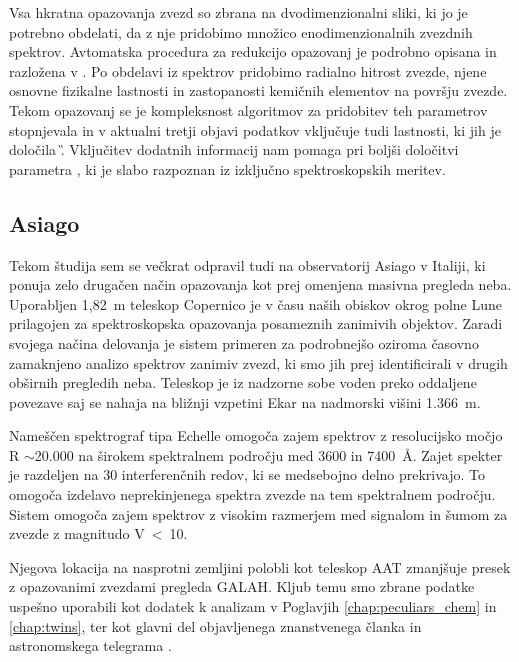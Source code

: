 Vsa hkratna opazovanja zvezd so zbrana na dvodimenzionalni sliki, ki jo je potrebno obdelati, da z nje pridobimo množico enodimenzionalnih zvezdnih spektrov. Avtomatska procedura za redukcijo opazovanj je podrobno opisana in razložena v \citet{2017MNRAS.464.1259K}. Po obdelavi iz spektrov pridobimo radialno hitrost zvezde, njene osnovne fizikalne lastnosti in zastopanosti kemičnih elementov na površju zvezde. Tekom opazovanj se je kompleksnost algoritmov za pridobitev teh parametrov stopnjevala in v aktualni tretji objavi podatkov vključuje tudi lastnosti, ki jih je določila \G. Vključitev dodatnih informacij nam pomaga pri boljši določitvi parametra \Logg, ki je slabo razpoznan iz izključno spektroskopskih meritev.

\subsection{Asiago}
\label{sec:slo_asiago}
Tekom študija sem se večkrat odpravil tudi na observatorij Asiago v Italiji, ki ponuja zelo drugačen način opazovanja kot prej omenjena masivna pregleda neba. Uporabljen 1,82~m teleskop Copernico je v času naših obiskov okrog polne Lune prilagojen za spektroskopska opazovanja posameznih zanimivih objektov. Zaradi svojega načina delovanja je sistem primeren za podrobnejšo oziroma časovno zamaknjeno analizo spektrov zanimiv zvezd, ki smo jih prej identificirali v drugih obširnih pregledih neba. Teleskop je iz nadzorne sobe voden preko oddaljene povezave saj se nahaja na bližnji vzpetini Ekar na nadmorski višini 1.366~m. 

Nameščen spektrograf tipa Echelle omogoča zajem spektrov z resolucijsko močjo R $\sim$20.000 na širokem spektralnem področju med 3600 in 7400~\AA. Zajet spekter je razdeljen na 30 interferenčnih redov, ki se medsebojno delno prekrivajo. To omogoča izdelavo neprekinjenega spektra zvezde na tem spektralnem področju. Sistem omogoča zajem spektrov z visokim razmerjem med signalom in šumom za zvezde z magnitudo V~<~10. 

Njegova lokacija na nasprotni zemljini polobli kot teleskop AAT zmanjšuje presek z opazovanimi zvezdami pregleda GALAH. Kljub temu smo zbrane podatke uspešno uporabili kot dodatek k analizam v Poglavjih \ref{chap:peculiars_chem} in \ref{chap:twins}, ter kot glavni del objavljenega znanstvenega članka \cite{2019MNRAS.488.5536M} in astronomskega telegrama \cite{2019ATel13340....1M}.

